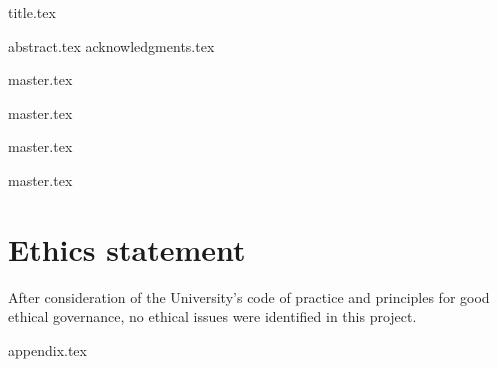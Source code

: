 \documentclass[a4paper, 12pt]{report}
\begin{document}
{title.tex}



\setcounter{tocdepth}{4}




{abstract.tex}
{acknowledgments.tex}


\tableofcontents

\newpage

\listoffigures

\newpage

\listoftables


% 

\printglossary[type=acronym]




\newpage

{master.tex}

\newpage

{master.tex}

\newpage

{master.tex}

\newpage

{master.tex}


\chapter{Ethics statement}

After consideration of the University's code of practice and principles for good ethical governance, no ethical issues were identified in this project. 


{appendix.tex}





\end{document}
